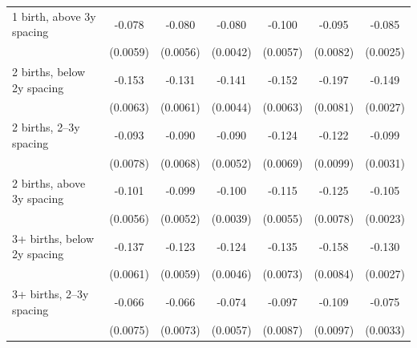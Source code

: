 {\begin{tabular}{l*{6}{c}}
\addlinespace
\hspace*{1em}1 birth, above 3y spacing&      -0.078\sym{***}&      -0.080\sym{***}&      -0.080\sym{***}&      -0.100\sym{***}&      -0.095\sym{***}&      -0.085\sym{***}\\
                    &    (0.0059)         &    (0.0056)         &    (0.0042)         &    (0.0057)         &    (0.0082)         &    (0.0025)         \\
\addlinespace
\hspace*{1em}2 births, below 2y spacing&      -0.153\sym{***}&      -0.131\sym{***}&      -0.141\sym{***}&      -0.152\sym{***}&      -0.197\sym{***}&      -0.149\sym{***}\\
                    &    (0.0063)         &    (0.0061)         &    (0.0044)         &    (0.0063)         &    (0.0081)         &    (0.0027)         \\
\addlinespace
\hspace*{1em}2 births, 2–3y spacing&      -0.093\sym{***}&      -0.090\sym{***}&      -0.090\sym{***}&      -0.124\sym{***}&      -0.122\sym{***}&      -0.099\sym{***}\\
                    &    (0.0078)         &    (0.0068)         &    (0.0052)         &    (0.0069)         &    (0.0099)         &    (0.0031)         \\
\addlinespace
\hspace*{1em}2 births, above 3y spacing&      -0.101\sym{***}&      -0.099\sym{***}&      -0.100\sym{***}&      -0.115\sym{***}&      -0.125\sym{***}&      -0.105\sym{***}\\
                    &    (0.0056)         &    (0.0052)         &    (0.0039)         &    (0.0055)         &    (0.0078)         &    (0.0023)         \\
\addlinespace
\hspace*{1em}3+ births, below 2y spacing&      -0.137\sym{***}&      -0.123\sym{***}&      -0.124\sym{***}&      -0.135\sym{***}&      -0.158\sym{***}&      -0.130\sym{***}\\
                    &    (0.0061)         &    (0.0059)         &    (0.0046)         &    (0.0073)         &    (0.0084)         &    (0.0027)         \\
\addlinespace
\hspace*{1em}3+ births, 2–3y spacing&      -0.066\sym{***}&      -0.066\sym{***}&      -0.074\sym{***}&      -0.097\sym{***}&      -0.109\sym{***}&      -0.075\sym{***}\\
                    &    (0.0075)         &    (0.0073)         &    (0.0057)         &    (0.0087)         &    (0.0097)         &    (0.0033)         \\

\end{tabular}}
